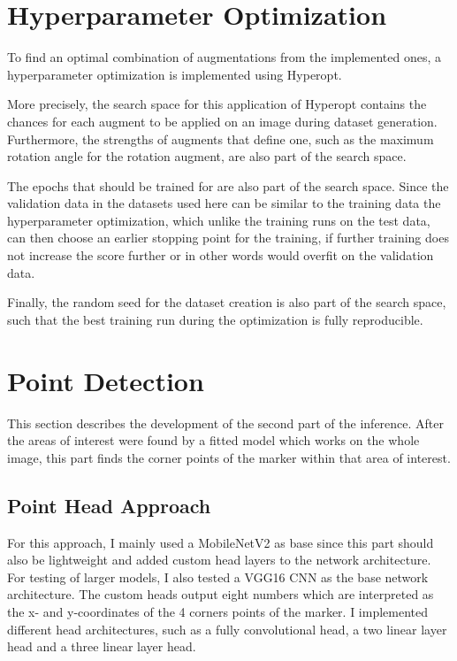 \documentclass[10pt]{book}
\begin{document}
\section{Hyperparameter Optimization}
\label{sec:hyper_opt}

To find an optimal combination of augmentations from the implemented ones, a hyperparameter optimization is implemented using Hyperopt. 

More precisely, the search space for this application of Hyperopt contains the chances for each augment to be applied on an image during dataset generation. Furthermore, the strengths of augments that define one, such as the maximum rotation angle for the rotation augment, are also part of the search space. 

The epochs that should be trained for are also part of the search space. Since the validation data in the datasets used here can be similar to the training data the hyperparameter optimization, which unlike the training runs on the test data, can then choose an earlier stopping point for the training, if further training does not increase the score further or in other words would overfit on the validation data. 

Finally, the random seed for the dataset creation is also part of the search space, such that the best training run during the optimization is fully reproducible.

\section{Point Detection}

This section describes the development of the second part of the inference. After the areas of interest were found by a fitted model which works on the whole image, this part finds the corner points of the marker within that area of interest.

\subsection{Point Head Approach}

For this approach, I mainly used a MobileNetV2 as base since this part should also be lightweight and added custom head layers to the network architecture. For testing of larger models, I also tested a VGG16 \ac{CNN} as the base network architecture. The custom heads output eight numbers which are interpreted as the x- and y-coordinates of the 4 corners points of the marker. I implemented different head architectures, such as a fully convolutional head, a two linear layer head and a three linear layer head.
\end{document}
